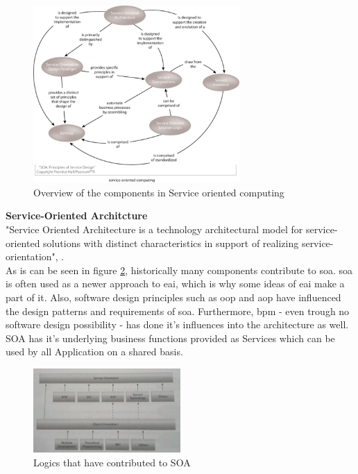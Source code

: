 \documentclass[12pt]{article}
\begin{document}
\begin{figure}[here!]
	\centering
	\includegraphics[width=0.7\textwidth]{images/serviceorientationdotcomwhatissoa}
	\caption{Overview of the components in Service oriented computing \cite{photos}}
	\label{fig:serviceorientedcomuting}
	\end{figure}
	\FloatBarrier\noindent
\textbf{Service-Oriented Architcture}\\
"Service Oriented Architecture is a technology architectural model for service-oriented solutions with distinct characteristics in support of realizing service-orientation", \cite[page 27]{grau}. \\
As is can be seen in figure \ref{fig:eaipartofso}, historically many components contribute to \gls{soa}. \gls{soa} is often used as a newer approach to \gls{eai}, which is why some ideas of \gls{eai} make a part of it. \cite{soaitwissen} Also, software design principles such as \gls{oop} and \gls{aop} have influenced the design patterns and requirements of \gls{soa}. Furthermore, \gls{bpm} - even trough no software design possibility - has done it's influences into the architecture as well. \\
SOA has it's underlying business functions provided as Services which can be used by all Application on a shared basis. 
\begin{figure}[here!]
	\centering
	\includegraphics[width=0.5\textwidth]{images/b1_25.jpg}
	\caption{Logics that have contributed to SOA \cite[page 25]{grau}}
	\label{fig:eaipartofso}
	\end{figure}
\end{document}
